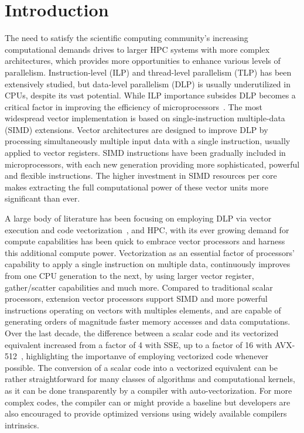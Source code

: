 \documentclass[sigconf]{acmart}
\begin{document}
\section{Introduction}\label{sec:intro}
The need to satisfy the scientific computing community's increasing
computational demands drives to larger HPC systems with more complex architectures,
which provides more opportunities to enhance various levels of parallelism.
%
Instruction-level (ILP) and thread-level parallelism (TLP) has been extensively
studied, but data-level parallelism (DLP) is usually underutilized in CPUs, despite its vast potential.
While ILP importance subsides DLP becomes a critical
factor in improving the efficiency of
microprocessors~\cite{energy_effects, Hardware_Events, espasa1998vector, Watson1972TheTA, cluster_efficiency}.
The most widespread vector implementation is based on single-instruction multiple-data (SIMD) extensions.
Vector architectures are designed to improve DLP by processing simultaneously multiple input data with a single instruction, usually applied to vector registers.
SIMD instructions have been gradually included in
microprocessors, with each new generation providing more sophisticated, powerful and flexible
instructions. The higher investment in SIMD resources per core makes extracting the
full computational power of these vector units more significant than ever.

A large body of literature has been focusing on employing DLP via vector
execution and code vectorization~\cite{Vectorizing_Compilers1,vectorizingcompilers,SIMD_Vector_Operations}, and HPC, with its ever growing demand for compute capabilities has been quick to embrace vector processors and harness this additional compute power.
Vectorization as an essential factor of processors' capability to apply
a single instruction on multiple data, continuously improves
from one CPU generation to the next, by using larger vector register, gather/scatter capabilities and much more.
Compared to traditional scalar processors, extension vector processors support
SIMD and more powerful instructions operating
on vectors with multiples elements, and are capable of generating orders of magnitude faster memory accesses and data computations.
Over the last decade, the difference between a scalar code and its vectorized equivalent
increased from a factor of 4 with SSE, up to a factor of 16 with AVX-512~\cite{Pentium_III,Haswell_detail,avx-info}, highlighting the importanve of employing vectorized code whenever possible.
The conversion of a scalar code into a vectorized
equivalent can be rather straightforward for many classes of algorithms
and computational kernels, as it can be done transparently by a compiler
with auto-vectorization. For more complex codes, the compiler can or might
provide a baseline but developers are also encouraged to provide optimized
versions using widely available compilers intrinsics.
%
\end{document}
